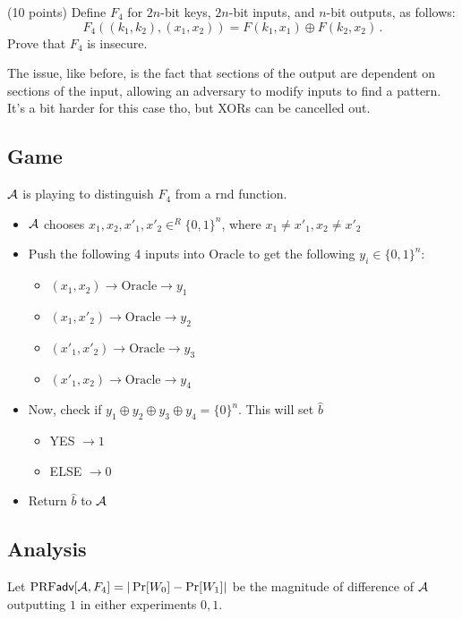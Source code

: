 \documentclass[12pt]{article}
\begin{document}
\begin{problem}
\begin{ppart} (10 points)
Define $F_4$  for $2n$-bit keys, $2n$-bit inputs, and $n$-bit outputs, as follows: 
\[
F_4((k_1, k_2), (x_1, x_2))=F(k_1, x_1)\oplus F(k_2, x_2)\,.
\]
Prove that $F_4$ is insecure.
\end{ppart}

\begin{solution}
The issue, like before, is the fact that sections of the output are dependent on sections of the input, allowing an adversary to modify inputs to find a pattern. It's a bit harder for this case tho, but XORs can be cancelled out.

\subsection*{Game}
$\mathcal{A}$ is playing to distinguish $F_4$ from a rnd function.
\begin{itemize}
  \item $\mathcal{A}$ chooses $x_1, x_2, x'_1, x'_2 \in^R \{0, 1\}^n$, where $x_1 \neq x'_1, x_2 \neq x'_2$
  \item Push the following 4 inputs into $\text{Oracle}$ to get the following $y_i \in \{0, 1\}^n$:
  \begin{itemize}
    \item $(x_1, x_2) \to \text{Oracle} \to y_1$
    \item $(x_1, x'_2) \to \text{Oracle} \to y_2$
    \item $(x'_1, x'_2) \to \text{Oracle} \to y_3$
    \item $(x'_1, x_2) \to \text{Oracle} \to y_4$
  \end{itemize}
  \item Now, check if $y_1 \oplus y_2 \oplus y_3 \oplus y_4 = \{0\}^n$. This will set $\hat{b}$
  \begin{itemize}
    \item YES $\to 1$
    \item ELSE $\to 0$
  \end{itemize}
  \item Return $\hat{b}$ to $\mathcal{A}$
\end{itemize}

\subsection*{Analysis}
Let $\textrm{PRF}\textsf{adv}[\mathcal{A}, F_4] = |\Pr[W_0] - \Pr[W_1]|$ be the magnitude of difference of $\mathcal{A}$ outputting $1$ in either experiments $0, 1$.


\end{solution}
\end{problem}
\end{document}
